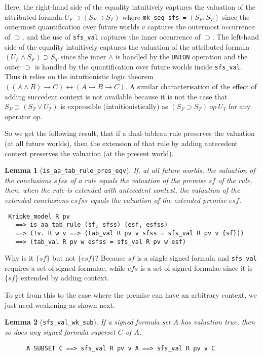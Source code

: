 \documentclass[a4paper]{article}
\newtheorem{lemma}{Lemma}
\begin{document}
Here, the right-hand side of the equality 
intuitively captures the valuation of the attributed formula
$U_F \supset (S_F \supset S_T)$ where
\texttt{mk\_seq sfs =} $(S_F, S_T)$
since the outermost quantification over future worlds $v$ captures the
outermost occurrence of $\supset$, and the use of \texttt{sfs\_val}
captures the inner occurrence of $\supset$.
The left-hand side of the equality intuitively captures the valuation
of the attributed formula
$(U_F \land S_F) \supset S_T$
since the inner $\land$ is handled by the
\texttt{UNION} operation and the outer $\supset$ is handled by the
quantification over future worlds inside \texttt{sfs\_val}.
Thus it relies on the intuitionistic logic theorem
$((A \land B) \to C) \leftrightarrow (A \to B \to C)$.
A similar characterisation of the effect of adding succedent
context is not available because it is not the case that $S_F \supset (S_T
\lor U_T)$ is expressible (intuitionistically) as $(S_F \supset S_T) ~op~
U_T$ for any operator $op$.

So we get the following result, that if a dual-tableau rule preserves the
valuation (at all future worlds), then the extension of that rule by
adding antecedent context preserves the valuation (at the present
world).

\begin{lemma}[\texttt{is\_aa\_tab\_rule\_pres\_eqv}] 
  \label{is-aa-tab-rule-pres-eqv}
  If, at all future worlds, the valuation of the conclusions
  $\mathit{sfss}$ of a rule
  equals the valuation of the premise $\mathit{sf}$ of the rule,
  then, when the rule is extended with antecedent context,
  the valuation of the  extended conclusions $\mathit{esfss}$
    equals the valuation of the extended premise $\mathit{esf}$.
\end{lemma}
\begin{verbatim}
 Kripke_model R pv 
   ==> is_aa_tab_rule (sf, sfss) (esf, esfss) 
   ==> (!v. R w v ==> (tab_val R pv v sfss = sfs_val R pv v {sf}))
   ==> (tab_val R pv w esfss = sfs_val R pv w esf)
\end{verbatim}
Why is it $\{sf\}$ but not $\{esf\}$?
Because $sf$ is a single signed formula and \texttt{sfs\_val} requires
a set of signed-formulae, while $efs$ is a set of signed-formulae since
it is $\{sf\}$ extended by adding context.

To get from this to the case where the premise can have an arbitrary context,
we just need weakening as shown next.

\begin{lemma}[\texttt{sfs\_val\_wk\_sub}] \label{sfs-val-wk-sub}
If a signed formula set $A$ has valuation true,
then so does any signed formula superset $C$ of $A$.
\end{lemma}
\begin{verbatim}
      A SUBSET C ==> sfs_val R pv v A ==> sfs_val R pv v C
\end{verbatim}
\end{document}
